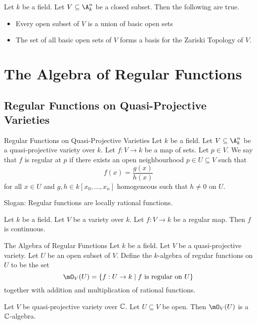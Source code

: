 \documentclass[a4paper]{article}
\begin{document}
\begin{prp}{}{} Let $k$ be a field. Let $V\subseteq\A_k^n$ be a closed subset. Then the following are true. 
\begin{itemize}
\item Every open subset of $V$ is a union of basic open sets
\item The set of all basic open sets of $V$ forms a basis for the Zariski Topology of $V$. 
\end{itemize}
\end{prp}

\pagebreak
\section{The Algebra of Regular Functions}
\subsection{Regular Functions on Quasi-Projective Varieties}
\begin{defn}{Regular Functions on Quasi-Projective Varieties}{} Let $k$ be a field. Let $V\subseteq\A_k^n$ be a quasi-projective variety over $k$. Let $f:V\to k$ be a map of sets. Let $p\in V$. We say that $f$ is regular at $p$ if there exists an open neighbourhood $p\in U\subseteq V$ such that $$f(x)=\frac{g(x)}{h(x)}$$ for all $x\in U$ and $g,h\in k[x_0,\dots,x_n]$ homogeneous such that $h\neq 0$ on $U$. 
\end{defn}

Slogan: Regular functions are locally rational functions. 

\begin{prp}{}{} Let $k$ be a field. Let $V$ be a variety over $k$. Let $f:V\to k$ be a regular map. Then $f$ is continuous. 
\end{prp}

\begin{defn}{The Algebra of Regular Functions}{} Let $k$ be a field. Let $V$ be a quasi-projective variety. Let $U$ be an open subset of $V$. Define the $k$-algebra of regular functions on $U$ to be the set $$\mO_V(U)=\{f:U\to k\;|\;f\text{ is regular on }U\}$$ together with addition and multiplication of rational functions. 
\end{defn}

\begin{lmm}{}{} Let $V$ be quasi-projective variety over $\mathbb{C}$. Let $U\subseteq V$ be open. Then $\mO_V(U)$ is a $\mathbb{C}$-algebra. 
\end{lmm}
\end{document}
